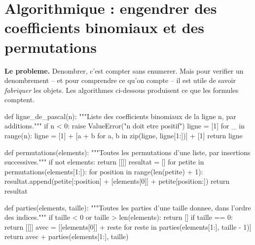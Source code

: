 
\section{Algorithmique : engendrer des coefficients binomiaux et des permutations}



\textbf{Le probleme.} Denombrer, c'est compter sans enumerer. Mais pour
verifier un denombrement -- et pour comprendre ce qu'on compte -- il est utile
de savoir \emph{fabriquer} les objets. Les algorithmes ci-dessous produisent
ce que les formules comptent.


\begin{python}
def ligne_de_pascal(n):
    """Liste des coefficients binomiaux de la ligne n, par additions."""
    if n < 0:
        raise ValueError("n doit etre positif")
    ligne = [1]
    for _ in range(n):
        ligne = [1] + [a + b for a, b in zip(ligne, ligne[1:])] + [1]
    return ligne

def permutations(elements):
    """Toutes les permutations d'une liste, par insertions successives."""
    if not elements:
        return [[]]
    resultat = []
    for petite in permutations(elements[1:]):
        for position in range(len(petite) + 1):
            resultat.append(petite[:position] + [elements[0]] + petite[position:])
    return resultat

def parties(elements, taille):
    """Toutes les parties d'une taille donnee, dans l'ordre des indices."""
    if taille < 0 or taille > len(elements):
        return []
    if taille == 0:
        return [[]]
    avec = [[elements[0]] + reste for reste in parties(elements[1:], taille - 1)]
    return avec + parties(elements[1:], taille)
\end{python}

